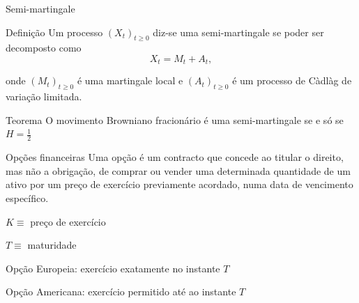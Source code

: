 \documentclass{beamer}
\begin{document}
\begin{frame}{Semi-martingale}

\begin{block}{Definição}
    Um processo $(X_{t})_{t \geq 0}$ diz-se uma semi-martingale se poder ser decomposto como 
    $$X_t=M_t+A_t,$$

    onde $(M_t)_{t \geq 0}$ é uma martingale local e $(A_t)_{t \geq 0}$ é um processo de Càdlàg de variação limitada.
\end{block}

\pause
\vspace{0.5cm}

\begin{block}{Teorema}
    O movimento Browniano fracionário é uma semi-martingale se e só se $H=\frac{1}{2}$
\end{block}

\end{frame}



\begin{frame}{Opções financeiras}
Uma opção é um contracto que concede ao titular o direito, mas não a obrigação, de comprar ou vender uma determinada quantidade de um ativo por um preço de exercício previamente acordado, numa data de vencimento específico.

\vspace{0.5cm}

$K \equiv $ preço de exercício

$T \equiv$ maturidade

\vspace{0.5cm}

Opção Europeia: exercício exatamente no instante $T$

Opção Americana: exercício permitido até ao instante $T$

\end{frame}
\end{document}
